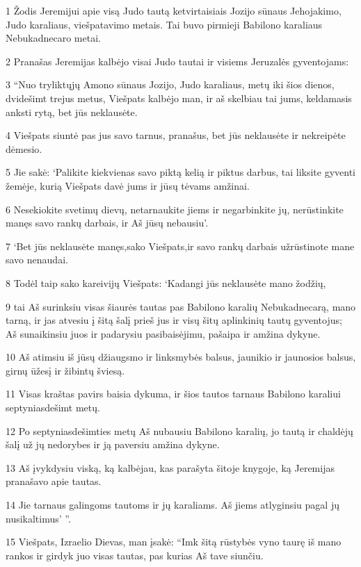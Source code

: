 \par 1 Žodis Jeremijui apie visą Judo tautą ketvirtaisiais Jozijo sūnaus Jehojakimo, Judo karaliaus, viešpatavimo metais. Tai buvo pirmieji Babilono karaliaus Nebukadnecaro metai. 
\par 2 Pranašas Jeremijas kalbėjo visai Judo tautai ir visiems Jeruzalės gyventojams: 
\par 3 “Nuo tryliktųjų Amono sūnaus Jozijo, Judo karaliaus, metų iki šios dienos, dvidešimt trejus metus, Viešpats kalbėjo man, ir aš skelbiau tai jums, keldamasis anksti rytą, bet jūs neklausėte. 
\par 4 Viešpats siuntė pas jus savo tarnus, pranašus, bet jūs neklausėte ir nekreipėte dėmesio. 
\par 5 Jie sakė: ‘Palikite kiekvienas savo piktą kelią ir piktus darbus, tai liksite gyventi žemėje, kurią Viešpats davė jums ir jūsų tėvams amžinai. 
\par 6 Nesekiokite svetimų dievų, netarnaukite jiems ir negarbinkite jų, nerūstinkite manęs savo rankų darbais, ir Aš jūsų nebausiu’. 
\par 7 ‘Bet jūs neklausėte manęs,­sako Viešpats,­ir savo rankų darbais užrūstinote mane savo nenaudai. 
\par 8 Todėl taip sako kareivijų Viešpats: ‘Kadangi jūs neklausėte mano žodžių, 
\par 9 tai Aš surinksiu visas šiaurės tautas pas Babilono karalių Nebukadnecarą, mano tarną, ir jas atvesiu į šitą šalį prieš jus ir visų šitų aplinkinių tautų gyventojus; Aš sunaikinsiu juos ir padarysiu pasibaisėjimu, pašaipa ir amžina dykyne. 
\par 10 Aš atimsiu iš jūsų džiaugsmo ir linksmybės balsus, jaunikio ir jaunosios balsus, girnų ūžesį ir žibintų šviesą. 
\par 11 Visas kraštas pavirs baisia dykuma, ir šios tautos tarnaus Babilono karaliui septyniasdešimt metų. 
\par 12 Po septyniasdešimties metų Aš nubausiu Babilono karalių, jo tautą ir chaldėjų šalį už jų nedorybes ir ją paversiu amžina dykyne. 
\par 13 Aš įvykdysiu viską, ką kalbėjau, kas parašyta šitoje knygoje, ką Jeremijas pranašavo apie tautas. 
\par 14 Jie tarnaus galingoms tautoms ir jų karaliams. Aš jiems atlyginsiu pagal jų nusikaltimus’ ”. 
\par 15 Viešpats, Izraelio Dievas, man įsakė: “Imk šitą rūstybės vyno taurę iš mano rankos ir girdyk juo visas tautas, pas kurias Aš tave siunčiu. 
